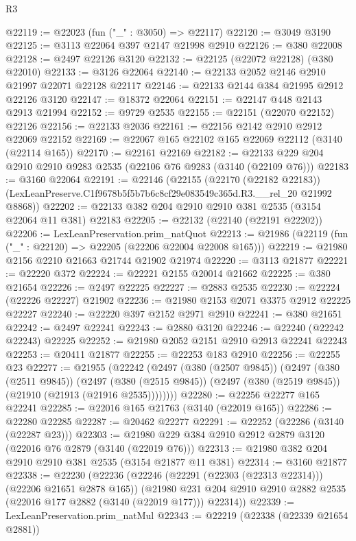 \begin{lexlean}{R3}
\begin{coremodule}
@22119 := @22023 (fun ("_" : @3050) => @22117)
@22120 := @3049 @3190
@22125 := @3113 @22064 @397 @2147 @21998 @2910
@22126 := @380 @22008
@22128 := @2497 @22126 @3120
@22132 := @22125 (@22072 @22128) (@380 @22010)
@22133 := @3126 @22064
@22140 := @22133 @2052 @2146 @2910 @21997 @22071 @22128 @22117
@22146 := @22133 @2144 @384 @21995 @2912 @22126 @3120
@22147 := @18372 @22064
@22151 := @22147 @448 @2143 @2913 @21994
@22152 := @9729 @2535
@22155 := @22151 (@22070 @22152) @22126
@22156 := @22133 @2036
@22161 := @22156 @2142 @2910 @2912 @22069 @22152
@22169 := @22067 @165 @22102 @165 @22069 @22112 (@3140 (@22114 @165))
@22170 := @22161 @22169
@22182 := @22133 @229 @204 @2910 @2910 @9283 @2535 (@22106 @76 @9283 (@3140 (@22109 @76)))
@22183 := @3160 @22064
@22191 := @22146
    (@22155
      (@22170 (@22182 @22183))
      (LexLeanPreserve.C1f9678b5f5b7b6c8cf29e083549c365d.R3.__rel_20 @21992 @8868))
@22202 := @22133 @382 @204 @2910 @2910 @381 @2535 (@3154 @22064 @11 @381) @22183
@22205 := @22132 (@22140 (@22191 @22202))
@22206 := LexLeanPreservation.prim_natQuot
@22213 := @21986 (@22119 (fun ("_" : @22120) => @22205 (@22206 @22004 @22008 @165)))
@22219 := @21980 @2156 @2210 @21663 @21744 @21902 @21974
@22220 := @3113 @21877
@22221 := @22220 @372
@22224 := @22221 @2155 @20014 @21662
@22225 := @380 @21654
@22226 := @2497 @22225
@22227 := @2883 @2535
@22230 := @22224 (@22226 @22227) @21902
@22236 := @21980 @2153 @2071 @3375 @2912 @22225 @22227
@22240 := @22220 @397 @2152 @2971 @2910
@22241 := @380 @21651
@22242 := @2497 @22241
@22243 := @2880 @3120
@22246 := @22240 (@22242 @22243) @22225
@22252 := @21980 @2052 @2151 @2910 @2913 @22241 @22243
@22253 := @20411 @21877
@22255 := @22253 @183 @2910
@22256 := @22255 @23
@22277 := @21955
    (@22242
      (@2497
        (@380 (@2507 @9845))
        (@2497
          (@380 (@2511 @9845))
          (@2497
            (@380 (@2515 @9845))
            (@2497 (@380 (@2519 @9845)) (@21910 (@21913 (@21916 @2535))))))))
@22280 := @22256 @22277 @165 @22241
@22285 := @22016 @165 @21763 (@3140 (@22019 @165))
@22286 := @22280 @22285
@22287 := @20462 @22277
@22291 := @22252 (@22286 (@3140 (@22287 @23)))
@22303 := @21980 @229 @384 @2910 @2912 @2879 @3120 (@22016 @76 @2879 (@3140 (@22019 @76)))
@22313 := @21980 @382 @204 @2910 @2910 @381 @2535 (@3154 @21877 @11 @381)
@22314 := @3160 @21877
@22338 := @22230
    (@22236
      (@22246 (@22291 (@22303 (@22313 @22314))) (@22206 @21651 @2878 @165))
      (@21980 @231 @204 @2910 @2910 @2882 @2535 (@22016 @177 @2882 (@3140 (@22019 @177))) @22314))
@22339 := LexLeanPreservation.prim_natMul
@22343 := @22219 (@22338 (@22339 @21654 @2881))

\end{coremodule}
\end{lexlean}
